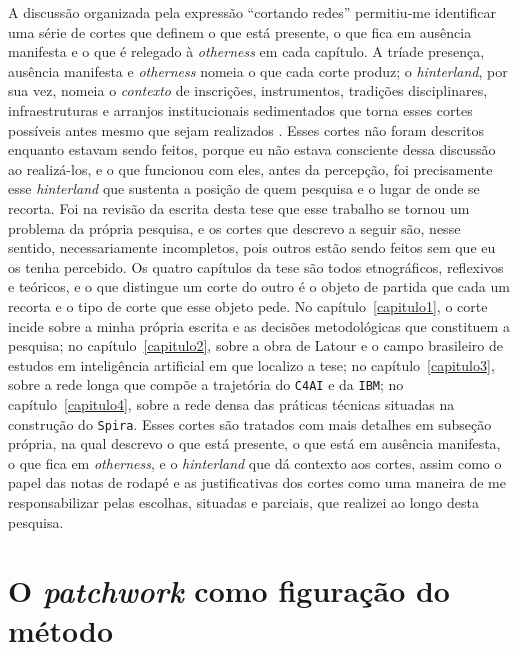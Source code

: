 A discussão organizada pela expressão \enquote{cortando redes} permitiu-me identificar uma série de cortes que definem o que está presente, o que fica em ausência manifesta e o que é relegado à \textit{otherness} em cada capítulo. A tríade presença, ausência manifesta e \textit{otherness} nomeia o que cada corte produz; o \textit{hinterland}, por sua vez, nomeia o \textit{contexto} de inscrições, instrumentos, tradições disciplinares, infraestruturas e arranjos institucionais sedimentados que torna esses cortes possíveis antes mesmo que sejam realizados \parencite[pp.~32--34, 40--41]{Law2004After}. Esses cortes não foram descritos enquanto estavam sendo feitos, porque eu não estava consciente dessa discussão ao realizá-los, e o que funcionou com eles, antes da percepção, foi precisamente esse \textit{hinterland} que sustenta a posição de quem pesquisa e o lugar de onde se recorta. Foi na revisão da escrita desta tese que esse trabalho se tornou um problema da própria pesquisa, e os cortes que descrevo a seguir são, nesse sentido, necessariamente incompletos, pois outros estão sendo feitos sem que eu os tenha percebido. Os quatro capítulos da tese são todos etnográficos, reflexivos e teóricos, e o que distingue um corte do outro é o objeto de partida que cada um recorta e o tipo de corte que esse objeto pede. No capítulo~\ref{capitulo1}, o corte incide sobre a minha própria escrita e as decisões metodológicas que constituem a pesquisa; no capítulo~\ref{capitulo2}, sobre a obra de Latour e o campo brasileiro de estudos em inteligência artificial em que localizo a tese; no capítulo~\ref{capitulo3}, sobre a rede longa que compõe a trajetória do \texttt{C4AI} e da \texttt{IBM}; no capítulo~\ref{capitulo4}, sobre a rede densa das práticas técnicas situadas na construção do \texttt{Spira}. Esses cortes são tratados com mais detalhes em subseção própria, na qual descrevo o que está presente, o que está em ausência manifesta, o que fica em \textit{otherness}, e o \textit{hinterland} que dá contexto aos cortes, assim como o papel das notas de rodapé e as justificativas dos cortes como uma maneira de me responsabilizar pelas escolhas, situadas e parciais, que realizei ao longo desta pesquisa. 

\section{O \textit{patchwork} como figuração do método}
\label{subsec:corte_reflexivo_cap1}

